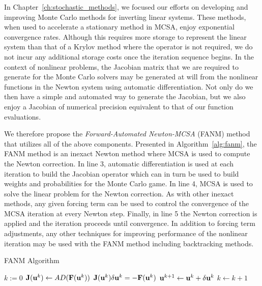 In Chapter~\ref{ch:stochastic_methods}, we focused our efforts on
developing and improving Monte Carlo methods for inverting linear
systems. These methods, when used to accelerate a stationary method in
MCSA, enjoy exponential convergence rates. Although this requires more
storage to represent the linear system than that of a Krylov method
where the operator is not required, we do not incur any additional
storage costs once the iteration sequence begins. In the context of
nonlinear problems, the Jacobian matrix that we are required to
generate for the Monte Carlo solvers may be generated at will from the
nonlinear functions in the Newton system using automatic
differentiation. Not only do we then have a simple and automated way
to generate the Jacobian, but we also enjoy a Jacobian of numerical
precision equivalent to that of our function evaluations.

We therefore propose the \textit{Forward-Automated Newton-MCSA} (FANM)
method that utilizes all of the above components. Presented in
Algorithm~\ref{alg:fanm}, the FANM method is an inexact Newton method
where MCSA is used to compute the Newton correction. In line 3,
automatic differentiation is used at each iteration to build the
Jacobian operator which can in turn be used to build weights and
probabilities for the Monte Carlo game. In line 4, MCSA is used to
solve the linear problem for the Newton correction. As with other
inexact methods, any given forcing term can be used to control the
convergence of the MCSA iteration at every Newton step. Finally, in
line 5 the Newton correction is applied and the iteration proceeds
until convergence. In addition to forcing term adjustments, any other
techniques for improving performance of the nonlinear iteration may be
used with the FANM method including backtracking methods.

\begin{algorithm}[h!]
  \caption{FANM Algorithm}
  \label{alg:fanm}
  \begin{algorithmic}[1]
    \State $k := 0$ 
    \State $\mathbf{J}(\mathbf{u}^{k}) \leftarrow AD(\mathbf{F}(\mathbf{u}^k))$ 
    \State $\mathbf{J}(\mathbf{u}^k) \delta \mathbf{u}^k = -\mathbf{F}(\mathbf{u}^{k})$
    \State $\mathbf{u}^{k+1} \leftarrow \mathbf{u}^k + \delta \mathbf{u}^k$ 
    \State $k \leftarrow k+1$ 
    \EndWhile
  \end{algorithmic}
\end{algorithm}

